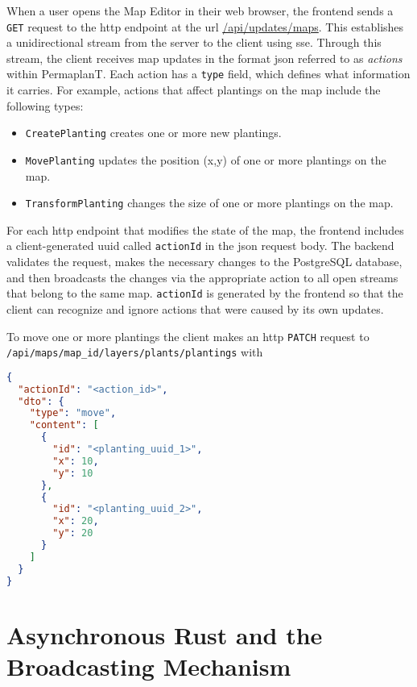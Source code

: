 \documentclass[final,draft,oneside]{vutinfth}
\begin{document}
When a user opens the Map Editor in their web browser, the frontend sends a \texttt{GET} request to the \gls{http} endpoint at the url \url{/api/updates/maps}.
This establishes a unidirectional stream from the server to the client using \gls{sse}.
Through this stream, the client receives map updates in the format \gls{json} referred to as \emph{actions} within PermaplanT.
Each action has a \texttt{type} field, which defines what information it carries.
For example, actions that affect plantings on the map include the following types:
\begin{itemize}
    \item \texttt{CreatePlanting} creates one or more new plantings.
    \item \texttt{MovePlanting} updates the position (x,y) of one or more plantings on the map.
    \item\texttt{TransformPlanting} changes the size of one or more plantings on the map.
\end{itemize}

For each \gls{http} endpoint that modifies the state of the map, the frontend includes a client-generated \gls{uuid} called \texttt{actionId} in the \gls{json} request body.
The backend validates the request, makes the necessary changes to the PostgreSQL database, and then broadcasts the changes via the appropriate action to all open streams that belong to the same map.
\texttt{actionId} is generated by the frontend so that the client can recognize and ignore actions that were caused by its own updates.

To move one or more plantings the client makes an \gls{http} \texttt{PATCH} request to \texttt{/api/maps/{map\_id}/layers/plants/plantings} with


\begin{lstlisting}[language=json]
{
  "actionId": "<action_id>",
  "dto": {
    "type": "move",
    "content": [
      {
        "id": "<planting_uuid_1>",
        "x": 10,
        "y": 10
      },
      {
        "id": "<planting_uuid_2>",
        "x": 20,
        "y": 20
      }
    ]
  }
}
\end{lstlisting}


\section{Asynchronous Rust and the Broadcasting Mechanism}
\end{document}

